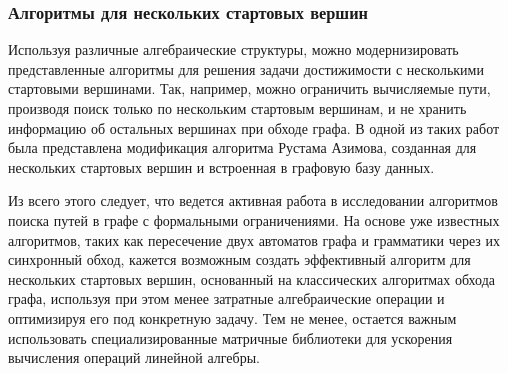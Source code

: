 \subsubsection{Алгоритмы для нескольких стартовых вершин}

Используя различные алгебраические структуры, можно модернизировать представленные алгоритмы для решения задачи достижимости с несколькими стартовыми вершинами. Так, например, можно ограничить вычисляемые пути, производя поиск только по нескольким стартовым вершинам, и не хранить информацию об остальных вершинах при обходе графа. В одной из таких работ~\cite{related_ars} была представлена модификация алгоритма Рустама Азимова, созданная для нескольких стартовых вершин и встроенная в графовую базу данных.

Из всего этого следует, что ведется активная работа в исследовании алгоритмов поиска путей в графе с формальными ограничениями. На основе уже известных алгоритмов, таких как пересечение двух автоматов графа и грамматики через их синхронный обход, кажется возможным создать эффективный алгоритм для нескольких стартовых вершин, основанный на классических алгоритмах обхода графа, используя при этом менее затратные алгебраические операции и оптимизируя его под конкретную задачу. Тем не менее, остается важным использовать специализированные матричные библиотеки для ускорения вычисления операций линейной алгебры.
